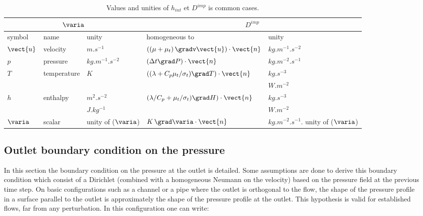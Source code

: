 \begin{table}
\begin{center}
\begin{tabular}{||l|l|l||l|l||}
\hline
\multicolumn{3}{||c||}{$\varia$} & \multicolumn{2}{c||}{$D^{imp}$} \\
\hline
symbol     & name                & unity         & homogeneous to             & unity                                     \\
\hline
$\vect{u}$ & velocity            & $m.s^{-1}$         &$\left( (\mu+\mu_t)\,\gradv \vect{u} \right)\cdot \vect{n}$  & $kg.m^{-1}.s^{-2} $       \\
$p$        & pressure            & $kg.m^{-1}.s^{-2}$ &$\left( \Delta t \grad P \right) \cdot \vect{n}$             & $kg.m^{-2}.s^{-1}$                        \\
$T$        & temperature         & $K$                &$\left( (\lambda+C_p\mu_t/\sigma_t)\grad T\right) \cdot \vect{n} $ &$kg.s^{-3}$ \\
                 &                         &                                     &                                  &$W.m^{-2}$ \\       
$h$          & enthalpy           & $m^{2}.s^{-2}$          &$\left( \lambda/C_p+\mu_t/\sigma_t) \grad H \right) \cdot \vect{n}$&$kg.s^{-3}$ \\
                 &                        & $J.kg^{-1}$               &                                                                                                               & $W.m^{-2}$  \\
$\varia$   & scalar               & unity of ($\varia$)       &$K \,\grad \varia \cdot \vect{n}$              & $kg.m^{-2}.s^{-1}.$ unity of ($\varia$)       \\
\hline
\end{tabular}
\end{center}
\caption{Values and unities of $h_{int}$ et $D^{imp}$  is common cases.}\label{tab:bndcnd:hint_phi_condli}
\end{table}

\subsection{Outlet boundary condition on the pressure}\label{Base_Condli_Sortie_Pression}

In this section the boundary condition on the pressure at the outlet is detailed. Some
assumptions are done to derive this boundary condition which consist of a Dirichlet
(combined with a homogeneous Neumann on the velocity) based on the pressure field
at the previous time step.
On basic configurations such as a channel or a pipe where the outlet is orthogonal 
to the flow, the shape of the pressure profile in a surface parallel to the outlet is
approximately the shape of the pressure profile at the outlet. This hypothesis 
is valid for established flows, far from any perturbation. In this configuration
one can write:

